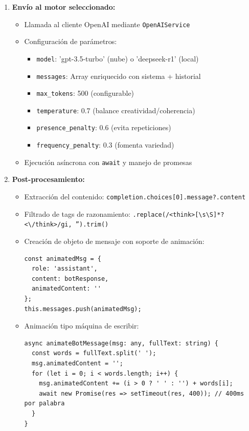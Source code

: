 \documentclass[12pt,a4paper]{report}
\numberwithin{figure}{section}
\begin{document}
\begin{enumerate}
  \item \textbf{Envío al motor seleccionado:}
  \begin{itemize}
    \item Llamada al cliente OpenAI mediante \texttt{OpenAIService}
    \item Configuración de parámetros:
    \begin{itemize}
      \item \texttt{model}: 'gpt-3.5-turbo' (nube) o 'deepseek-r1' (local)
      \item \texttt{messages}: Array enriquecido con sistema + historial
      \item \texttt{max\_tokens}: 500 (configurable)
      \item \texttt{temperature}: 0.7 (balance creatividad/coherencia)
      \item \texttt{presence\_penalty}: 0.6 (evita repeticiones)
      \item \texttt{frequency\_penalty}: 0.3 (fomenta variedad)
    \end{itemize}
    \item Ejecución asíncrona con \texttt{await} y manejo de promesas
  \end{itemize}
  
  \item \textbf{Post-procesamiento:}
  \begin{itemize}
    \item Extracción del contenido: \texttt{completion.choices[0].message?.content}
    \item Filtrado de tags de razonamiento: \texttt{.replace(/<think>[\textbackslash s\textbackslash S]*?<\textbackslash /think>/gi, '').trim()}
    \item Creación de objeto de mensaje con soporte de animación:
    \begin{lstlisting}[style=angelcode]
const animatedMsg = {
  role: 'assistant', 
  content: botResponse, 
  animatedContent: ''
};
this.messages.push(animatedMsg);
    \end{lstlisting}
    \item Animación tipo máquina de escribir:
    \begin{lstlisting}[style=angelcode]
async animateBotMessage(msg: any, fullText: string) {
  const words = fullText.split(' ');
  msg.animatedContent = '';
  for (let i = 0; i < words.length; i++) {
    msg.animatedContent += (i > 0 ? ' ' : '') + words[i];
    await new Promise(res => setTimeout(res, 400)); // 400ms por palabra
  }
}
    \end{lstlisting}
  \end{itemize}
  

\end{enumerate}
\end{document}
